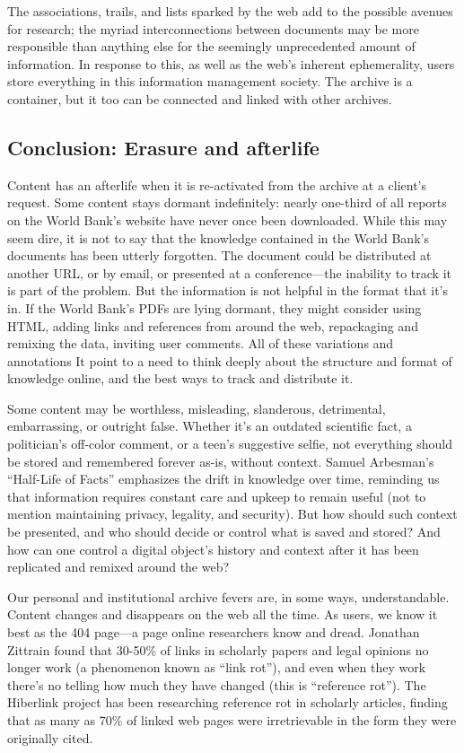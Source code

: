 The associations, trails, and lists sparked by the web add to the possible avenues for research; the myriad interconnections between documents may be more responsible than anything else for the seemingly unprecedented amount of information. In response to this, as well as the web's inherent ephemerality, users store everything in this information management society. The archive is a container, but it too can be connected and linked with other archives.

\subsection{Conclusion: Erasure and afterlife}

Content has an afterlife when it is re-activated from the archive at a client's request. Some content stays dormant indefinitely: nearly one-third of all reports on the World Bank's website have never once been downloaded. While this may seem dire, it is not to say that the knowledge contained in the World Bank's documents has been utterly forgotten. The document could be distributed at another URL, or by email, or presented at a conference---the inability to track it is part of the problem. But the information is not helpful in the format that it's in. If the World Bank's PDFs are lying dormant, they might consider using HTML, adding links and references from around the web, repackaging and remixing the data, inviting user comments. All of these variations and annotations It point to a need to think deeply about the structure and format of knowledge online, and the best ways to track and distribute it.

Some content may be worthless, misleading, slanderous, detrimental, embarrassing, or outright false. Whether it's an outdated scientific fact, a politician's off-color comment, or a teen's suggestive selfie, not everything should be stored and remembered forever as-is, without context. Samuel Arbesman's ``Half-Life of Facts'' emphasizes the drift in knowledge over time, reminding us that information requires constant care and upkeep to remain useful (not to mention maintaining privacy, legality, and security). But how should such context be presented, and who should decide or control what is saved and stored? And how can one control a digital object's history and context after it has been replicated and remixed around the web?

Our personal and institutional archive fevers are, in some ways, understandable. Content changes and disappears on the web all the time. As users, we know it best as the 404 page---a page online researchers know and dread. Jonathan Zittrain found that 30-50\% of links in scholarly papers and legal opinions no longer work (a phenomenon known as ``link rot''), and even when they work there's no telling how much they have changed (this is ``reference rot''). The Hiberlink project has been researching reference rot in scholarly articles, finding that as many as 70\% of linked web pages were irretrievable in the form they were originally cited.\autocite{lanl.gov}

